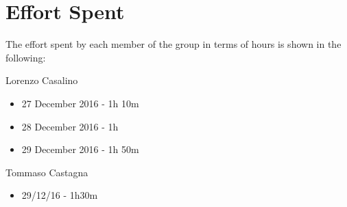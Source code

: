 \section{Effort Spent}

The effort spent by each member of the group in terms of hours is shown in the following:

Lorenzo Casalino

\begin{itemize}
	\item 27 December 2016 - 1h 10m
	\item 28 December 2016 - 1h
	\item 29 December 2016 - 1h 50m
\end{itemize}

Tommaso Castagna

\begin{itemize}
	\item 29/12/16 - 1h30m
\end{itemize}

